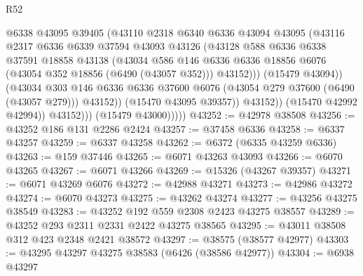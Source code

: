 \begin{lexlean}{R52}
\begin{coremodule}
                            @6338
                            @43095
                            @39405
                            (@43110
                              @2318
                              @6340
                              @6336
                              @43094
                              @43095
                              (@43116
                                @2317
                                @6336
                                @6339
                                @37594
                                @43093
                                @43126
                                (@43128
                                  @588
                                  @6336
                                  @6338
                                  @37591
                                  @18858
                                  @43138
                                  (@43034
                                    @586
                                    @146
                                    @6336
                                    @6336
                                    @18856
                                    @6076
                                    (@43054 @352 @18856 (@6490 (@43057 @352)))
                                    @43152)))
                              (@15479 @43094))
                            (@43034
                              @303
                              @146
                              @6336
                              @6336
                              @37600
                              @6076
                              (@43054 @279 @37600 (@6490 (@43057 @279)))
                              @43152))
                          (@15470 @43095 @39357))
                        @43152))
                    (@15470 @42992 @42994))
                  @43152)))
            (@15479 @43000)))))
@43252 := @42978 @38508
@43256 := @43252 @186 @131 @2286 @2424
@43257 := @37458 @6336
@43258 := @6337 @43257
@43259 := @6337 @43258
@43262 := @6372 (@6335 @43259 @6336)
@43263 := @159 @37446
@43265 := @6071 @43263 @43093
@43266 := @6070 @43265
@43267 := @6071 @43266
@43269 := @15326 (@43267 @39357)
@43271 := @6071 @43269 @6076
@43272 := @42988 @43271
@43273 := @42986 @43272
@43274 := @6070 @43273
@43275 := @43262 @43274
@43277 := @43256 @43275 @38549
@43283 := @43252 @192 @559 @2308 @2423 @43275 @38557
@43289 := @43252 @293 @2311 @2331 @2422 @43275 @38565
@43295 := @43011 @38508 @312 @423 @2348 @2421 @38572
@43297 := @38575 (@38577 @42977)
@43303 := @43295 @43297 @43275 @38583 (@6426 (@38586 @42977))
@43304 := @6938 @43297

\end{coremodule}
\end{lexlean}

